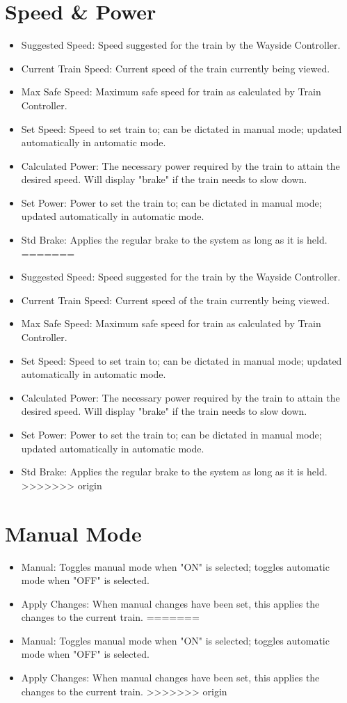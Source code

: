 \documentclass{scrreprt}
\begin{document}
\section{Speed \& Power}
\begin{itemize}
<<<<<<< HEAD
	\item Suggested Speed: Speed suggested for the train by the Wayside Controller.
	\item Current Train Speed: Current speed of the train currently being viewed.
	\item Max Safe Speed: Maximum safe speed for train as calculated by Train Controller.
	\item Set Speed: Speed to set train to; can be dictated in manual mode; updated automatically in automatic mode.
	\item Calculated Power: The necessary power required by the train to attain the desired speed. Will display "brake" if the train needs to slow down.
	\item Set Power: Power to set the train to; can be dictated in manual mode; updated automatically in automatic mode.
	\item Std Brake: Applies the regular brake to the system as long as it is held.
=======
    \item Suggested Speed: Speed suggested for the train by the Wayside Controller.
    \item Current Train Speed: Current speed of the train currently being viewed.
    \item Max Safe Speed: Maximum safe speed for train as calculated by Train Controller.
    \item Set Speed: Speed to set train to; can be dictated in manual mode; updated automatically in automatic mode.
    \item Calculated Power: The necessary power required by the train to attain the desired speed. Will display "brake" if the train needs to slow down.
    \item Set Power: Power to set the train to; can be dictated in manual mode; updated automatically in automatic mode.
    \item Std Brake: Applies the regular brake to the system as long as it is held.
>>>>>>> origin
\end{itemize}

\section{Manual Mode}
\begin{itemize}
<<<<<<< HEAD
	\item Manual: Toggles manual mode when "ON" is selected; toggles automatic mode when "OFF" is selected.
	\item Apply Changes: When manual changes have been set, this applies the changes to the current train.
=======
    \item Manual: Toggles manual mode when "ON" is selected; toggles automatic mode when "OFF" is selected.
    \item Apply Changes: When manual changes have been set, this applies the changes to the current train.
>>>>>>> origin
\end{itemize}
\end{document}
